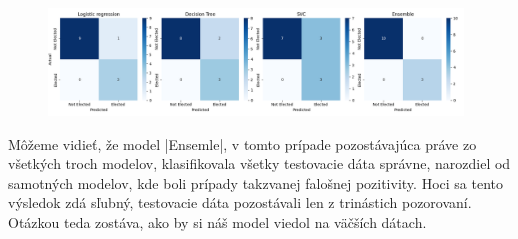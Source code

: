 \documentclass[report.tex]{subfiles}
\begin{document}
\begin{figure}[!htbp]
    \centering
    \includegraphics[width=0.98\textwidth]
    {images/confussion_matrix.png}
    \caption{}
    \label{fig:confussion_matrices}
\end{figure}
Môžeme vidieť, že model \pyth|Ensemle|, v tomto prípade pozostávajúca práve zo všetkých troch modelov, klasifikovala všetky testovacie dáta správne, narozdiel od samotných modelov, kde boli prípady takzvanej falošnej pozitivity. Hoci sa tento výsledok zdá sľubný, testovacie dáta pozostávali len z trinástich pozorovaní. Otázkou teda zostáva, ako by si náš model viedol na väčších dátach.
\end{document}
